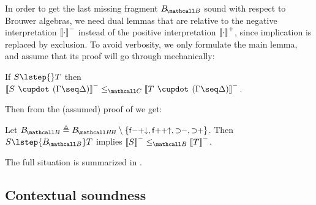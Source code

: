 In order to get the last missing fragment $\sysBB$ sound with respect to Brouwer
algebras, we need dual lemmas that are relative to the negative interpretation
$\left\llbracket \cdot \right\rrbracket^-$ instead of the positive interpretation $\left\llbracket \cdot \right\rrbracket^+$, since
implication is replaced by exclusion. To avoid verbosity, we only formulate the
main lemma, and assume that its proof will go through mechanically:

\begin{lemma}
  If $S \lstep{} T$ then $\nsint{S \mix (\Gamma \seq \Delta)} \sementC \nsint{T
  \mix (\Gamma \seq \Delta)}$.
\end{lemma}

Then from the (assumed) proof of  we get:
\begin{corollary}\label{cor:lcosoundness}
  Let $\sysBB \defeq \sysBHB \setminus \{\rsf{f{-}{+}{\da}},
  \rsf{f{+}{+}{\ua}}, \rsf{{\limp}{-}}, \rsf{{\limp}{+}}\}$. Then $S
  \lstep{\sysBB} T$ implies $\nsint{S} \sementB \nsint{T}$.
\end{corollary}

The full situation is summarized in .

\subsection{Contextual soundness}

